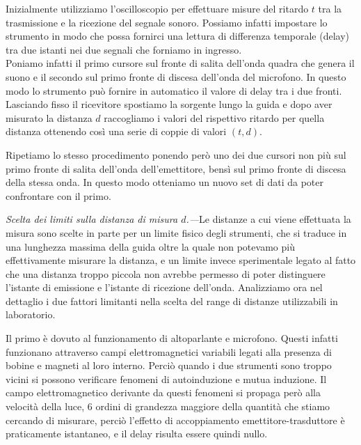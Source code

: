 \documentclass[
    rmp,
    reprint, 
    superscriptaddress, 
    altaffilletter, 
    amsmath, 
    amssymb, 
    a4paper,
    varvw]{revtex4-2}
\begin{document}
Inizialmente utilizziamo l'oscilloscopio per effettuare misure del ritardo $t$ tra la trasmissione e la ricezione del segnale sonoro. Possiamo infatti impostare lo strumento in modo che possa fornirci una lettura di differenza temporale (delay) tra due istanti nei due segnali che forniamo in ingresso. \\
Poniamo infatti il primo cursore sul fronte di salita dell'onda quadra che genera il suono e il secondo sul primo fronte di discesa dell'onda del microfono. In questo modo lo strumento può fornire in automatico il valore di delay tra i due fronti. \\
Lasciando fisso il ricevitore spostiamo la sorgente lungo la guida e dopo aver misurato la distanza $d$ raccogliamo i valori del rispettivo ritardo per quella distanza ottenendo così una serie di coppie di valori $(t,d)$.

Ripetiamo lo stesso procedimento ponendo però uno dei due cursori non più sul primo fronte di salita dell'onda dell'emettitore, bensì sul primo fronte di discesa della stessa onda. In questo modo otteniamo un nuovo set di dati da poter confrontare con il primo. 

\noindent\textit{Scelta dei limiti sulla distanza di misura $d$.---}Le distanze a cui viene effettuata la misura sono scelte in parte per un limite fisico degli strumenti, che si traduce in una lunghezza massima della guida oltre la quale non potevamo più effettivamente misurare la distanza, e un limite invece sperimentale legato al fatto che una distanza troppo piccola non avrebbe permesso di poter distinguere l'istante di emissione e l'istante di ricezione dell'onda. Analizziamo ora nel dettaglio i due fattori limitanti nella scelta del range di distanze utilizzabili in laboratorio. 

Il primo è dovuto al funzionamento di altoparlante e microfono. Questi infatti funzionano attraverso campi elettromagnetici variabili legati alla presenza di bobine e magneti al loro interno. Perciò quando i due strumenti sono troppo vicini si possono verificare fenomeni di autoinduzione e mutua induzione. Il campo elettromagnetico derivante da questi fenomeni si propaga però alla velocità della luce, 6 ordini di grandezza maggiore della quantità che stiamo cercando di misurare, perciò l'effetto di accoppiamento emettitore-trasduttore è praticamente istantaneo, e il delay risulta essere quindi nullo. 
\end{document}
